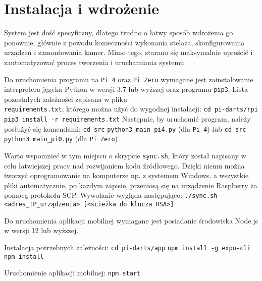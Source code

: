 \chapter{Instalacja i wdrożenie}
\label{installation}
\thispagestyle{chapterBeginStyle}

System jest dość specyficzny, dlatego trudno o łatwy sposób wdrożenia go ponownie, głównie z powodu konieczności wykonania stelaża, skonfigurowania urządzeń i zamontowania kamer. Mimo tego, starano się maksymalnie uprościć i zautomatyzować proces tworzenia i uruchamiania systemu.

Do uruchomienia programu na \verb|Pi 4| oraz \verb|Pi Zero| wymagane jest zainstalowanie interpretera języka Python w wersji 3.7 lub wyższej oraz programu \verb|pip3|. Lista pozostałych zależności zapisana w pliku \\ \verb|requirements.txt|, którego można użyć do wygodnej instalacji:
\newline \newline
\indent \verb|cd pi-darts/rpi| \newline
\indent \verb|pip3 install -r requirements.txt|
\newline \newline
\noindent Następnie, by uruchomić program, należy posłużyć się komendami: \newline \newline
\indent \verb|cd src| \newline
\indent \verb|python3 main_pi4.py| (dla \verb|Pi 4|) \newline\newline lub \indent \newline \newline \indent \verb|cd src| \newline \indent \verb|python3 main_pi0.py| (dla \verb|Pi Zero|) \newline

Warto wspomnieć w tym miejscu o skrypcie \verb|sync.sh|, który został napisany w celu łatwiejszej pracy nad rozwijaniem kodu źródłowego. Dzięki niemu można tworzyć oprogramowanie na komputerze np. z systemem Windows, a wszystkie pliki automatycznie, po każdym zapisie, przeniosą się na urządzenie Raspberry za pomocą protokołu SCP. Wywołanie wygląda następująco:
\newline \newline
\indent \verb|./sync.sh <adres_IP_urządzenia> [<ścieżka do klucza RSA>]|
\newline

Do uruchomienia aplikacji mobilnej wymagane jest posiadanie środowiska Node.js w wersji 12 lub wyższej. 

\noindent Instalacja potrzebnych zależności:
\newline \newline
\indent \verb|cd pi-darts/app| \newline
\indent \verb|npm install -g expo-cli| \newline
\indent \verb|npm install| \newline

\noindent Uruchomienie aplikacji mobilnej:
\newline \newline
\indent \verb|npm start| 
